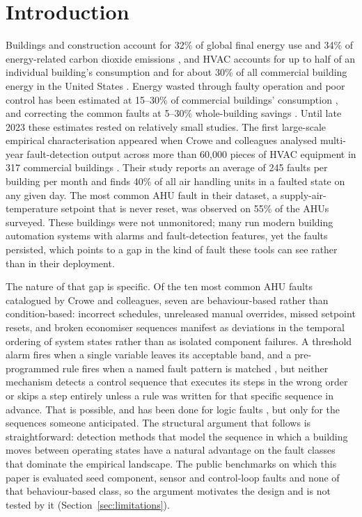\documentclass[11pt,letterpaper]{article}
\begin{document}
\section{Introduction}

Buildings and construction account for 32\% of global final energy use and 34\% of energy-related carbon dioxide emissions \cite{unep2025gsr}, and HVAC accounts for up to half of an individual building's consumption \cite{bi2024aihvacreview} and for about 30\% of all commercial building energy in the United States \cite{doe2017hvacsavings}.
Energy wasted through faulty operation and poor control has been estimated at 15--30\% of commercial buildings' consumption \cite{katipamula2005fddreview1,bi2024aihvacreview}, and correcting the common faults at 5--30\% whole-building savings \cite{pritoni2022faultcorrection,bi2024aihvacreview}.
Until late 2023 these estimates rested on relatively small studies. The first large-scale empirical characterisation appeared when Crowe and colleagues analysed multi-year fault-detection output across more than 60{,}000 pieces of HVAC equipment in 317 commercial buildings \cite{crowe2023faultprevalence}. Their study reports an average of 245 faults per building per month and finds 40\% of all air handling units in a faulted state on any given day. The most common AHU fault in their dataset, a supply-air-temperature setpoint that is never reset, was observed on 55\% of the AHUs surveyed. These buildings were not unmonitored; many run modern building automation systems with alarms and fault-detection features, yet the faults persisted, which points to a gap in the kind of fault these tools can see rather than in their deployment.

The nature of that gap is specific. Of the ten most common AHU faults catalogued by Crowe and colleagues, seven are behaviour-based rather than condition-based: incorrect schedules, unreleased manual overrides, missed setpoint resets, and broken economiser sequences manifest as deviations in the temporal ordering of system states rather than as isolated component failures. A threshold alarm fires when a single variable leaves its acceptable band, and a pre-programmed rule fires when a named fault pattern is matched \cite{schein2006apar}, but neither mechanism detects a control sequence that executes its steps in the wrong order or skips a step entirely unless a rule was written for that specific sequence in advance. That is possible, and has been done for logic faults \cite{gunay2022logicfaults}, but only for the sequences someone anticipated. The structural argument that follows is straightforward: detection methods that model the sequence in which a building moves between operating states have a natural advantage on the fault classes that dominate the empirical landscape. The public benchmarks on which this paper is evaluated seed component, sensor and control-loop faults and none of that behaviour-based class, so the argument motivates the design and is not tested by it (Section~\ref{sec:limitations}).
\end{document}

